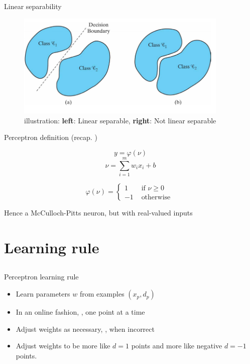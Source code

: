 \documentclass[notes]{beamer}
\providecommand{\tightlist}{%
  \setlength{\itemsep}{0pt}\setlength{\parskip}{0pt}}
\begin{document}
\begin{frame}{Linear separability}

\begin{figure}
\centering
\includegraphics[width=0.90000\textwidth]{2018-03-08-22-36-07.png}
\caption{illustration: \textbf{left}: Linear separable, \textbf{right}:
Not linear separable}
\end{figure}

\end{frame}

\begin{frame}{Perceptron definition (recap. )}

\[y=\varphi(\nu)\] \[\nu=\sum_{i=1}^{m} w_i x_i +b \]

\[\varphi (\nu) = \left\{ \begin{array}{cc}
    1  & \text{ if } \nu \ge 0 \\ 
    -1 & \text{ otherwise } 
    \end{array} \right. \]

Hence a McCulloch-Pitts neuron, but with real-valued inputs

\end{frame}

\section{Learning rule}\label{learning-rule}

\subsection{}\label{section-1}

\begin{frame}{Perceptron learning rule}

\begin{itemize}
\tightlist
\item
  Learn parameters \(w\) from examples \((x_p,d_p)\)
\item
  In an online fashion, \ie, one point at a time
\item
  Adjust weights as necessary, \ie, when incorrect
\item
  Adjust weights to be more like \(d=1\) points and more like negative
  \(d=-1\) points.
\end{itemize}

\end{frame}
\end{document}
